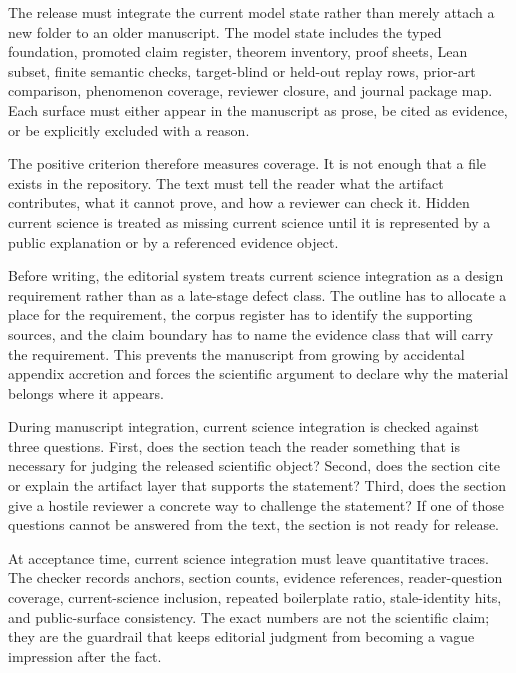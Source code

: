 The release must integrate the current model state rather than merely attach a new folder to an older manuscript. The model state includes the typed foundation, promoted claim register, theorem inventory, proof sheets, Lean subset, finite semantic checks, target-blind or held-out replay rows, prior-art comparison, phenomenon coverage, reviewer closure, and journal package map. Each surface must either appear in the manuscript as prose, be cited as evidence, or be explicitly excluded with a reason.


The positive criterion therefore measures coverage. It is not enough that a file exists in the repository. The text must tell the reader what the artifact contributes, what it cannot prove, and how a reviewer can check it. Hidden current science is treated as missing current science until it is represented by a public explanation or by a referenced evidence object.


Before writing, the editorial system treats current science integration as a design requirement rather than as a late-stage defect class. The outline has to allocate a place for the requirement, the corpus register has to identify the supporting sources, and the claim boundary has to name the evidence class that will carry the requirement. This prevents the manuscript from growing by accidental appendix accretion and forces the scientific argument to declare why the material belongs where it appears.


During manuscript integration, current science integration is checked against three questions. First, does the section teach the reader something that is necessary for judging the released scientific object? Second, does the section cite or explain the artifact layer that supports the statement? Third, does the section give a hostile reviewer a concrete way to challenge the statement? If one of those questions cannot be answered from the text, the section is not ready for release.


At acceptance time, current science integration must leave quantitative traces. The checker records anchors, section counts, evidence references, reader-question coverage, current-science inclusion, repeated boilerplate ratio, stale-identity hits, and public-surface consistency. The exact numbers are not the scientific claim; they are the guardrail that keeps editorial judgment from becoming a vague impression after the fact.


